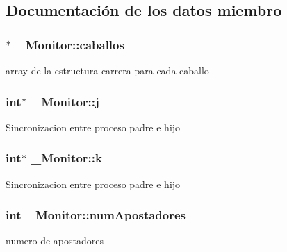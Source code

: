 \subsection{Documentación de los datos miembro}
\subsubsection[{\texorpdfstring{caballos}{caballos}}]{$\ast$ \+\_\+\+Monitor\+::caballos}\hypertarget{struct__Monitor_a4c856b284d47e65fddfa0b3898895489}{}\label{struct__Monitor_a4c856b284d47e65fddfa0b3898895489}
array de la estructura carrera para cada caballo 
\subsubsection[{\texorpdfstring{j}{j}}]{\setlength{\rightskip}{0pt plus 5cm}int$\ast$ \+\_\+\+Monitor\+::j}\hypertarget{struct__Monitor_a8c99fc7fcd474a35e14047b2d46af390}{}\label{struct__Monitor_a8c99fc7fcd474a35e14047b2d46af390}
Sincronizacion entre proceso padre e hijo 
\subsubsection[{\texorpdfstring{k}{k}}]{\setlength{\rightskip}{0pt plus 5cm}int$\ast$ \+\_\+\+Monitor\+::k}\hypertarget{struct__Monitor_ae06ed31d1e98a347e8147b713551fa26}{}\label{struct__Monitor_ae06ed31d1e98a347e8147b713551fa26}
Sincronizacion entre proceso padre e hijo 
\subsubsection[{\texorpdfstring{num\+Apostadores}{numApostadores}}]{\setlength{\rightskip}{0pt plus 5cm}int \+\_\+\+Monitor\+::num\+Apostadores}\hypertarget{struct__Monitor_a54944b0b93b7d647fed1a5225e02d40a}{}\label{struct__Monitor_a54944b0b93b7d647fed1a5225e02d40a}
numero de apostadores 
